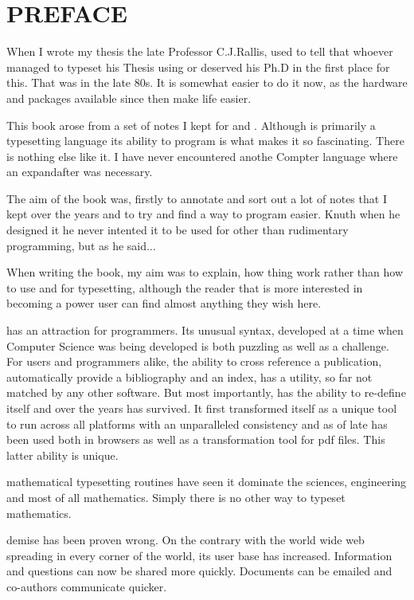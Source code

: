 \chapter*{PREFACE}

When I wrote my thesis the late Professor C.J.Rallis, used to tell that whoever managed to typeset his Thesis using \tex or \latex deserved his Ph.D in the first place for this. That was in the late 80s. It is somewhat easier to do it now, as the hardware and packages available since then make life easier.

This book arose from a set of notes I kept for \tex and \latex. Although \tex is primarily a typesetting language its ability to program is what makes it so fascinating. There is nothing else like it. I have never encountered anothe Compter language where an expandafter was necessary.

The aim of the book was, firstly to annotate and sort out a lot of notes that I kept over the years and to try and find a way to program \tex easier. Knuth when he designed it he never intented it to be used for other than rudimentary programming, but as he said$\ldots$

When writing the book, my aim was to explain, how thing work rather than how to use \latex and \tex for typesetting, although the reader that is more interested in becoming a power user can find almost anything they wish here.

\alltex has an attraction for programmers. Its unusual syntax, developed at a time when Computer Science was being developed is both puzzling as well as a challenge. For users and programmers alike, the ability to cross reference a publication, automatically provide a bibliography and an index, has a utility, so far not matched by any other software. But most importantly, \tex has the ability to re-define itself and over the years has survived. It first transformed itself as a unique tool to run across all platforms with an unparalleled consistency and as of late has been used both in browsers as well as a transformation tool for pdf files. This latter ability is unique.

\alltex mathematical typesetting routines have seen it dominate the sciences, engineering and most of all mathematics. Simply there is no other way to typeset mathematics.

\tex demise has been proven wrong. On the contrary with the world wide web spreading in every corner of the world, its user base has increased. Information and questions can now be shared more quickly. Documents can be emailed and co-authors communicate quicker.

